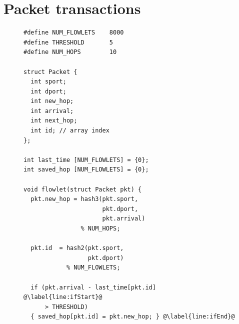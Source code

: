 \section{Packet transactions}
\label{s:transactions}

\begin{figure}[!t]
\begin{minipage}{0.5\textwidth}
\begin{small}
\begin{lstlisting}[style=customc]
#define NUM_FLOWLETS    8000
#define THRESHOLD       5
#define NUM_HOPS        10

struct Packet {
  int sport;
  int dport;
  int new_hop;
  int arrival;
  int next_hop;
  int id; // array index
};

int last_time [NUM_FLOWLETS] = {0};
int saved_hop [NUM_FLOWLETS] = {0};

void flowlet(struct Packet pkt) {
  pkt.new_hop = hash3(pkt.sport,
                      pkt.dport,
                      pkt.arrival)
                % NUM_HOPS;

  pkt.id  = hash2(pkt.sport,
                  pkt.dport)
            % NUM_FLOWLETS;

  if (pkt.arrival - last_time[pkt.id] @\label{line:ifStart}@
      > THRESHOLD)
  { saved_hop[pkt.id] = pkt.new_hop; } @\label{line:ifEnd}@


\end{lstlisting}
\end{small}
\end{minipage}
\end{figure}
